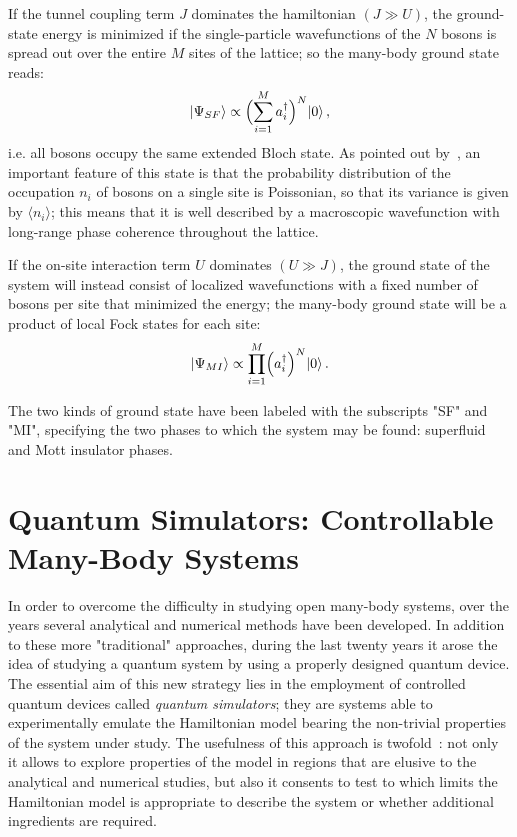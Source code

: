 If the tunnel coupling term $J$ dominates the hamiltonian $(J \gg U)$, the ground-state energy is minimized if the single-particle wavefunctions of the $N$ bosons is spread out over the entire $M$ sites of the lattice; so the many-body ground state reads:
\begin{equation}
    \ket{\Psi_{SF}} \propto \Bigl( \sum_{i=1}^M a^{\dagger}_i \Bigl)^N \ket{0},
\end{equation}
i.e. all bosons occupy the same extended Bloch state. As pointed out by~\cite{Greiner_bose_hubbard}, an important feature of this state is that the probability distribution of the occupation $n_i$ of bosons on a single site is Poissonian, so that its variance is given by $\langle n_i \rangle$; this means that it is well described by a macroscopic wavefunction with long-range phase coherence throughout the lattice.

If the on-site interaction term $U$ dominates $(U \gg J)$, the ground state of the system will instead consist of localized wavefunctions with a fixed number of bosons per site that minimized the energy; the many-body ground state will be a product of local Fock states for each site:
\begin{equation}
    \ket{\Psi_{MI}} \propto \prod_{i=1}^M \Bigl( a^{\dagger}_i\Bigl)^N \ket{0}.
\end{equation}

The two kinds of ground state have been labeled with the subscripts "SF" and "MI", specifying the two phases to which the system may be found: superfluid and Mott insulator phases.


\section{Quantum Simulators: Controllable Many-Body Systems}
In order to overcome the difficulty in studying open many-body systems, over the years several analytical and numerical methods have been developed. In addition to these more "traditional" approaches, during the last twenty years it arose the idea of studying a quantum system by using a properly designed quantum device. The essential aim of this new strategy lies in the employment of controlled quantum devices called \emph{quantum simulators}; they are systems able to experimentally emulate the Hamiltonian model bearing the non-trivial properties of the system under study. The usefulness of this approach is twofold~\cite{Tomadin_Fazio}:  not only it allows to explore properties of the model in regions that are elusive to the analytical and numerical studies, but also it consents to test to which limits the Hamiltonian model is appropriate to describe the system or whether additional ingredients are required.

